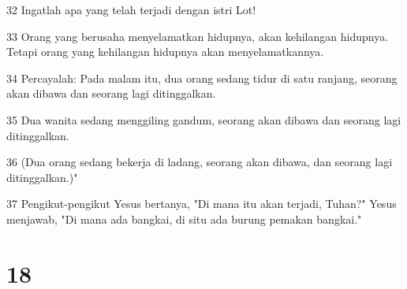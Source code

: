 \par 32 Ingatlah apa yang telah terjadi dengan istri Lot!
\par 33 Orang yang berusaha menyelamatkan hidupnya, akan kehilangan hidupnya. Tetapi orang yang kehilangan hidupnya akan menyelamatkannya.
\par 34 Percayalah: Pada malam itu, dua orang sedang tidur di satu ranjang, seorang akan dibawa dan seorang lagi ditinggalkan.
\par 35 Dua wanita sedang menggiling gandum, seorang akan dibawa dan seorang lagi ditinggalkan.
\par 36 (Dua orang sedang bekerja di ladang, seorang akan dibawa, dan seorang lagi ditinggalkan.)"
\par 37 Pengikut-pengikut Yesus bertanya, "Di mana itu akan terjadi, Tuhan?" Yesus menjawab, "Di mana ada bangkai, di situ ada burung pemakan bangkai."

\chapter{18}

